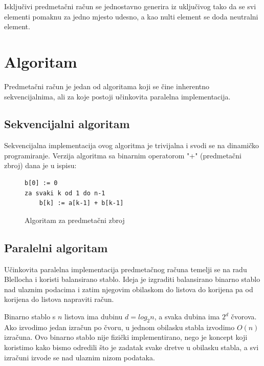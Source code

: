 \documentclass[times, utf8, zavrsni, numeric]{fer}
\begin{document}
Isključivi predmetačni račun se jednostavno generira iz uključivog tako da se svi elementi pomaknu za jedno mjesto udesno, a kao nulti element se doda neutralni element.


\section{Algoritam}

\indent

Predmetačni račun je jedan od algoritama koji se čine inherentno sekvencijalnima, ali za koje postoji učinkovita paralelna implementacija.

\subsection{Sekvencijalni algoritam}

\indent

Sekvencijalna implementacija ovog algoritma je trivijalna i svodi se na dinamičko programiranje. Verzija algoritma sa binarnim operatorom "+" (predmetačni zbroj) dana je u ispisu:

\begin{figure}[hbt]
\begin{singlespace}
\begin{lstlisting}[label={predmetacni zbroj}]
b[0] := 0
za svaki k od 1 do n-1
	b[k] := a[k-1] + b[k-1]
\end{lstlisting}
\end{singlespace}
\caption{Algoritam za predmetačni zbroj}
\label{prefixsumalgoritam}
\end{figure}

\subsection{Paralelni algoritam}
\indent

Učinkovita paralelna implementacija predmetačnog računa temelji se na radu Blellocha\cite{blelloch} i koristi balansirano stablo. Ideja je izgraditi balansirano binarno stablo nad ulaznim podacima i zatim njegovim obilaskom do listova do korijena pa od korijena do listova napraviti račun.

Binarno stablo s $n$ listova ima dubinu $d = log_{2}n$, a svaka dubina ima $2^{d}$ čvorova. Ako izvodimo jedan izračun po čvoru, u jednom obilasku stabla izvodimo $O(n)$ izračuna. Ovo binarno stablo nije fizički implementirano, nego je koncept koji koristimo kako bismo odredili što je zadatak svake dretve u obilasku stabla, a svi izračuni izvode se nad ulaznim nizom podataka.
\end{document}
